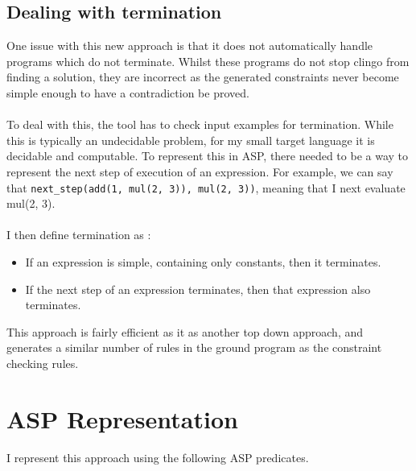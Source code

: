 \subsection{Dealing with termination}
One issue with this new approach is that it does not automatically handle programs which do not terminate. Whilst these programs do not stop clingo from finding a solution, they are incorrect as the generated constraints never become simple enough to have a contradiction be proved. \\ \\
To deal with this, the tool has to check input examples for termination. While this is typically an undecidable problem, for my small target language it is decidable and computable. To represent this in ASP, there needed to be a way to represent the next step of execution of an expression. For example, we can say that \lstinline{next_step(add(1, mul(2, 3)), mul(2, 3))}, meaning that I next evaluate mul(2, 3). \\ \\%
I then define termination as :
\begin{itemize}
\item If an expression is simple, containing only constants, then it terminates.
\item If the next step of an expression terminates, then that expression also terminates.
\end{itemize}

This approach is fairly efficient as it as another top down approach, and generates a similar number of rules in the ground program as the constraint checking rules.

\section{ASP Representation}
I represent this approach using the following ASP predicates.

